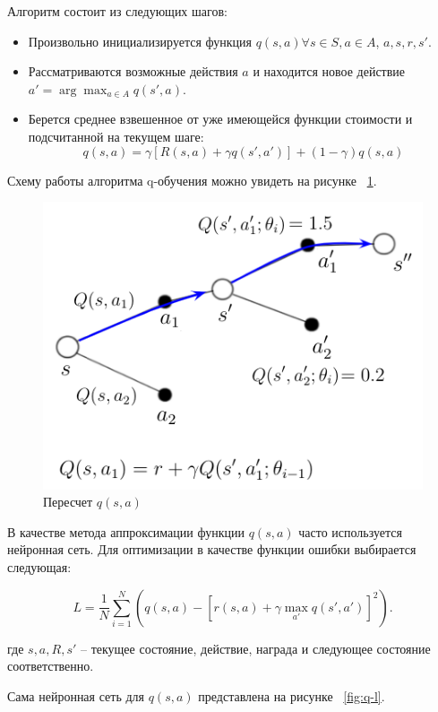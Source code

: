Алгоритм состоит из следующих шагов:
\begin{itemize}
    \item Произвольно инициализируется функция $q(s, a) \forall s \in S, a \in A$, $a, s, r, s'$.
    \item Рассматриваются возможные действия $a$ и находится новое действие $a' = \arg \max_{a \in A}q(s', a) $.
    \item Берется среднее взвешенное от уже имеющейся функции стоимости и подсчитанной на текущем шаге:  $$q(s, a) = \gamma [R(s, a) +\gamma q(s', a')] + (1-\gamma)q(s, a)$$
\end{itemize}

Схему работы алгоритма  q-обучения можно увидеть на рисунке ~\ref{fig:q-learn}. \newpage

\begin{figure}[h]
	\centering
	\includegraphics[scale=1]{q_learn.png}
	\caption {Пересчет $q(s, a)$}
	\label{fig:q-learn}
\end{figure}

В качестве метода аппроксимации функции $q(s, a)$ часто используется нейронная сеть. Для  оптимизации в качестве функции ошибки выбирается следующая:

$$L = \frac{1}{N} \sum\limits_{i=1}^N \left( q(s, a) - [r(s, a) + \gamma \max_{a'} q(s', a')]^2  \right) .$$

где $s, a, R, s'$ -- текущее состояние, действие, награда и следующее состояние соответственно. 

Сама нейронная сеть для $q(s, a)$ представлена на рисунке ~\ref{fig:q-l}. 


